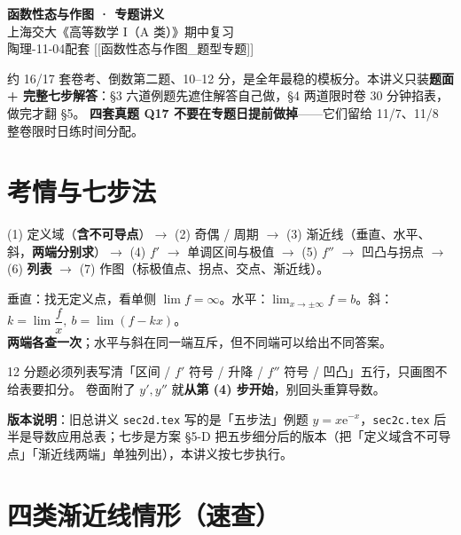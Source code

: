 \documentclass[11pt,a4paper]{ctexart}
\newcommand{\ee}{\mathrm{e}}
\begin{document}
\begin{center}
  {\LARGE\bfseries 函数性态与作图 · 专题讲义}\\[4pt]
  {\large 上海交大《高等数学 I（A 类）》期中复习}\\[4pt]
  {\small 陶理-11-04\quad 配套 [[函数性态与作图\_题型专题]]}
\end{center}

\begin{keypoint}[怎么用这本]
约 16/17 套卷考、倒数第二题、10--12 分，是全年最稳的模板分。本讲义只装\textbf{题面 + 完整七步解答}：\S 3 六道例题先遮住解答自己做，\S 4 两道限时卷 30 分钟掐表，做完才翻 \S 5。
\textbf{四套真题 Q17 不要在专题日提前做掉}——它们留给 11/7、11/8 整卷限时日练时间分配。
\end{keypoint}

\section{考情与七步法}

\begin{methodbox}
(1) 定义域（\textbf{含不可导点}）$\to$ (2) 奇偶 / 周期 $\to$ (3) 渐近线（垂直、水平、斜，\textbf{两端分别求}）$\to$ (4) $f'$ $\to$ 单调区间与极值 $\to$ (5) $f''$ $\to$ 凹凸与拐点 $\to$ (6) \textbf{列表} $\to$ (7) 作图（标极值点、拐点、交点、渐近线）。
\end{methodbox}

\begin{keypoint}[渐近线三查]
垂直：找无定义点，看单侧 $\lim f=\infty$。\quad 水平：$\lim_{x\to\pm\infty}f=b$。\quad 斜：$k=\lim\dfrac{f}{x},\ b=\lim(f-kx)$。\\
\textbf{两端各查一次}；水平与斜在同一端互斥，但不同端可以给出不同答案。
\end{keypoint}

\begin{warnbox}[列表是给分点]
12 分题必须列表写清「区间 / $f'$ 符号 / 升降 / $f''$ 符号 / 凹凸」五行，只画图不给表要扣分。
卷面附了 $y',y''$ 就\textbf{从第 (4) 步开始}，别回头重算导数。
\end{warnbox}

\noindent\textbf{版本说明}：旧总讲义 \texttt{sec2d.tex} 写的是「五步法」例题 $y=x\ee^{-x}$，\texttt{sec2c.tex} 后半是导数应用总表；七步是方案 §5-D 把五步细分后的版本（把「定义域含不可导点」「渐近线两端」单独列出），本讲义按七步执行。

\section{四类渐近线情形（速查）}
\end{document}

